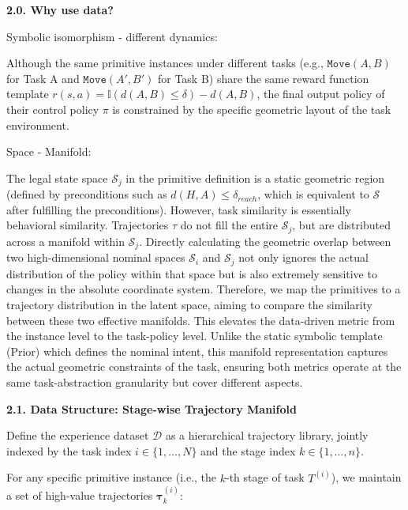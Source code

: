 \documentclass{article}
\begin{document}


\textbf{2.0. Why use data?}

Symbolic isomorphism - different dynamics: 

Although the same primitive instances under different tasks (e.g., $\texttt{Move}(A, B)$ for Task A and $\texttt{Move}(A', B')$ for Task B) share the same reward function template $r(s, a) = \mathbb{I}(d(A, B) \le \delta) - d(A, B)$, the final output policy of their control policy $\pi$ is constrained by the specific geometric layout of the task environment.

Space - Manifold: 

The legal state space $\mathcal{S}_j$ in the primitive definition is a static geometric region (defined by preconditions such as $d(H, A) \le \delta_{reach}$, which is equivalent to $\mathcal{S}$ after fulfilling the preconditions).
However, task similarity is essentially behavioral similarity. Trajectories $\tau$ do not fill the entire $\mathcal{S}_j$, but are distributed across a manifold within $\mathcal{S}_j$. 
Directly calculating the geometric overlap between two high-dimensional nominal spaces $\mathcal{S}_i$ and $\mathcal{S}_j$ not only ignores the actual distribution of the policy within that space but is also extremely sensitive to changes in the absolute coordinate system.
Therefore, we map the primitives to a trajectory distribution in the latent space, aiming to compare the similarity between these two effective manifolds. This elevates the data-driven metric from the instance level to the task-policy level. Unlike the static symbolic template (Prior) which defines the nominal intent, this manifold representation captures the actual geometric constraints of the task, ensuring both metrics operate at the same task-abstraction granularity but cover different aspects.

\textbf{2.1. Data Structure: Stage-wise Trajectory Manifold}

Define the experience dataset $\mathcal{D}$ as a hierarchical trajectory library, jointly indexed by the task index $i \in \{1, \dots, N\}$ and the stage index $k \in \{1, \dots, n\}$.

For any specific primitive instance (i.e., the $k$-th stage of task $T^{(i)}$), we maintain a set of high-value trajectories
$\boldsymbol{\tau}^{(i)}_k$: 
\end{document}
